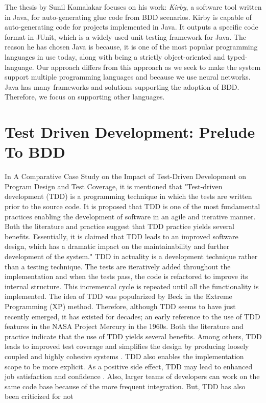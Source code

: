 \documentclass[conference]{IEEEtran}
\begin{document}
The thesis by Sunil Kamalakar focuses on his work: \textit{Kirby}, a software tool written in Java, for auto-generating glue code from BDD scenarios. Kirby is capable of auto-generating code for projects implemented in Java. It outputs a speciﬁc code format in JUnit, which is a widely used unit testing framework for Java. The reason he has chosen Java is because, it is one of the most popular programming languages in use today, along with being a strictly object-oriented and typed-language.\cite{a2} Our approach differs from this approach as we seek to make the system support multiple programming languages and because we use neural networks.
Java has many frameworks and solutions supporting the adoption of BDD. Therefore, we focus on supporting other languages.

\section{Test Driven Development: Prelude To BDD}
In A Comparative Case Study on the Impact of
Test-Driven Development on Program Design and Test Coverage, it is mentioned that "Test-driven development (TDD) is a programming technique in which the tests are written prior to the source code. It is proposed that TDD is one of the most fundamental practices enabling the development of software in an agile and iterative manner. Both the literature and practice suggest that TDD practice yields several benefits. Essentially, it is claimed that TDD leads to an improved software design, which has a dramatic impact on the maintainability and further development of the system."\cite{b6} TDD in actuality is a development technique rather than a testing technique.\cite{b7} The tests are iteratively added throughout the implementation and when the tests pass, the code is refactored to improve its internal structure. This incremental cycle is repeated until all the functionality is implemented.\cite{b8} The idea of TDD was popularized by Beck\cite{b9} in the Extreme Programming (XP) method. Therefore, although TDD seems to have just recently emerged, it has existed for decades; an early reference to the use of TDD features in the NASA Project Mercury in the 1960s\cite{b10}. 
Both the literature and practice indicate that the use of
TDD yields several benefits. Among others, TDD leads to improved test coverage \cite{b8} and simplifies the design by producing loosely coupled and highly cohesive systems
\cite{b11}. TDD also enables the implementation scope to be more explicit. As a positive side effect, TDD may lead to enhanced job satisfaction and confidence \cite{b11}. Also, larger teams of developers can work on the same code base because of the more frequent integration\cite{b7}.  But, TDD has also been criticized for not
\end{document}
